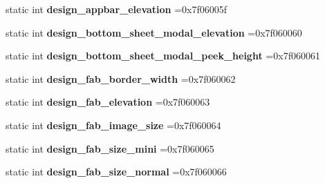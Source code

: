 \begin{DoxyCompactItemize}
\mbox{\label{classandroid_1_1support_1_1design_1_1R_1_1dimen_a4752e8a9bb853ea6471565f7fee4205a}} 
static int {\bfseries design\+\_\+appbar\+\_\+elevation} =0x7f06005f
\item 
\mbox{\label{classandroid_1_1support_1_1design_1_1R_1_1dimen_ae89a08cc389583475fab13f35668062b}} 
static int {\bfseries design\+\_\+bottom\+\_\+sheet\+\_\+modal\+\_\+elevation} =0x7f060060
\item 
\mbox{\label{classandroid_1_1support_1_1design_1_1R_1_1dimen_a2ba78ec2e18e56dbf452e9c8c16edf83}} 
static int {\bfseries design\+\_\+bottom\+\_\+sheet\+\_\+modal\+\_\+peek\+\_\+height} =0x7f060061
\item 
\mbox{\label{classandroid_1_1support_1_1design_1_1R_1_1dimen_a468412fd2ff843bb4b0a75509ddfca24}} 
static int {\bfseries design\+\_\+fab\+\_\+border\+\_\+width} =0x7f060062
\item 
\mbox{\label{classandroid_1_1support_1_1design_1_1R_1_1dimen_ad5800e70448522e82924047fb1b30a23}} 
static int {\bfseries design\+\_\+fab\+\_\+elevation} =0x7f060063
\item 
\mbox{\label{classandroid_1_1support_1_1design_1_1R_1_1dimen_a97283d11ecc0057a392ad59438fcd6b4}} 
static int {\bfseries design\+\_\+fab\+\_\+image\+\_\+size} =0x7f060064
\item 
\mbox{\label{classandroid_1_1support_1_1design_1_1R_1_1dimen_abfb225a9980b348f37057b11cf664d3b}} 
static int {\bfseries design\+\_\+fab\+\_\+size\+\_\+mini} =0x7f060065
\item 
\mbox{\label{classandroid_1_1support_1_1design_1_1R_1_1dimen_a5f6d298593b91f322e2c349bd2224ea3}} 
static int {\bfseries design\+\_\+fab\+\_\+size\+\_\+normal} =0x7f060066
\item 
\mbox{\label{classandroid_1_1support_1_1design_1_1R_1_1dimen_aee6a2942da6da73fa5fea17a5a93d0b3}} 

\end{DoxyCompactItemize}
